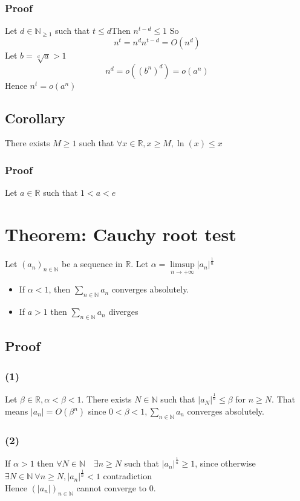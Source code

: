 \documentclass{book}
\begin{document}
\subsubsection*{Proof}
Let $d\in\mathbb{N} _{\geq1}$ such that $t\leq d$Then $n^{t-d}\leq 1$
So
$$n^t=n^dn^{t-d}=O(n^d)$$
Let $b=\sqrt[d]{a}>1$$$n^d=o((b^n)^d)=o(a^n)$$
\indent Hence $n^t=o(a^n)$
\subsection{Corollary}
There exists $M\geq1$ such that $\forall x\in \mathbb{R} ,x\geq M,\ln(x)\leq x$
\subsubsection*{Proof}
Let $a\in\mathbb{R} $ such that $1<a<e$
\section{Theorem: Cauchy root test}
Let $(a_n)_{n\in\mathbb{N} }$ be a sequence in $\mathbb{R} $. Let $\alpha=\limsup\limits_{n\rightarrow+\infty}\lvert a_n\rvert^{\frac{1}{n}}$\begin{itemize}
    \item If $\alpha<1$, then $\sum\limits_{n\in \mathbb{N} }a_n$ converges absolutely.
    \item If $a>1$ then $\sum\limits_{n\in \mathbb{N} }a_n$ diverges
\end{itemize}
\subsection*{Proof}
\subsubsection{(1)}
Let $\beta\in \mathbb{R} ,\alpha<\beta<1$. There exists $N\in \mathbb{N} $ such that $\lvert a_N \rvert^{\frac{1}{n}}\leq\beta$ for $n\geq N$. That means  $\lvert a_n\rvert=O(\beta ^n)$ since $0<\beta<1,\sum\limits_{n\in \mathbb{N} }a_n$ converges absolutely.
\subsubsection{(2)}
If $\alpha>1$ then $\forall N\in \mathbb{N} \quad \exists n \geq N$ such that $\lvert a_n\rvert ^{\frac{1}{n}}\geq1$, since otherwise $\exists N\in \mathbb{N} \ \forall n\geq N,\lvert a_n\rvert^\frac{1}{n}<1$ contradiction\\
Hence $(\lvert a_n\rvert)_{n\in \mathbb{N} }$ cannot converge to 0.
\end{document}
